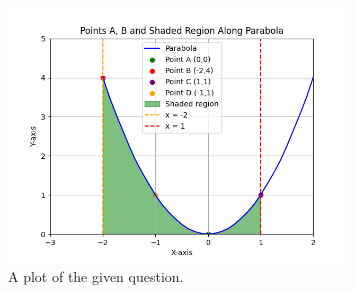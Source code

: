 \documentclass[journal]{IEEEtran}
\numberwithin{equation}{enumi}
\numberwithin{figure}{enumi}
\begin{document}
\begin{figure}[ht]
	\centering
	\includegraphics[width=0.8\textwidth]{figs/fig.png}
	\caption{A plot of the given question.}
\end{figure}
\end{document}
